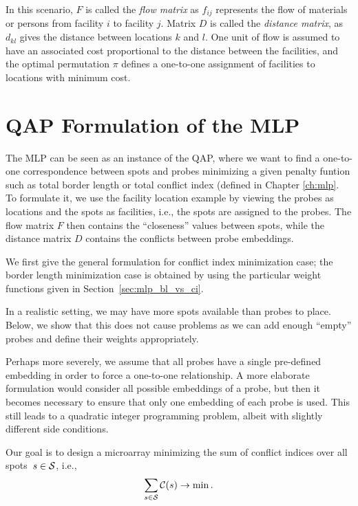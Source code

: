 In this scenario, $F$ is called the \emph{flow matrix} as $f_{ij}$ represents
the flow of materials or persons from facility $i$ to facility $j$. Matrix $D$
is called the \emph{distance matrix}, as $d_{kl}$ gives the distance between
locations $k$ and $l$. One unit of flow is assumed to have an associated cost
proportional to the distance between the facilities, and the optimal permutation
$\pi$ defines a one-to-one assignment of facilities to locations with minimum
cost.

\section{QAP Formulation of the MLP}
\label{sec:qap_mlp}

The MLP can be seen as an instance of the QAP, where we want to find a one-to-
one correspondence between spots and probes minimizing a given penalty funtion
such as total border length or total conflict index (defined in Chapter
\ref{ch:mlp}. To formulate it, we use the facility location example by viewing
the probes as locations and the spots as facilities, i.e., the spots are
assigned to the probes. The flow matrix $F$ then contains the ``closeness''
values between spots, while the distance matrix $D$ contains the conflicts
between probe embeddings.

We first give the general formulation for conflict index minimization case; the
border length minimization case is obtained by using the particular weight
functions given in Section~\ref{sec:mlp_bl_vs_ci}.

In a realistic setting, we may have more spots available than probes to place.
Below, we show that this does not cause problems as we can add enough ``empty''
probes and define their weights appropriately.

Perhaps more severely, we assume that all probes have a single pre-defined
embedding in order to force a one-to-one relationship.  A more elaborate
formulation would consider all possible embeddings of a probe, but then it
becomes necessary to ensure that only one embedding of each probe is used. This
still leads to a quadratic integer programming problem, albeit with slightly
different side conditions.

Our goal is to design a microarray minimizing the sum of conflict indices over
all spots~$s \in {\mathcal{S}}$, i.e.,
\[
\sum_{s \in {\mathcal{S}}} \mathcal{C}(s) \to \min.
\]

